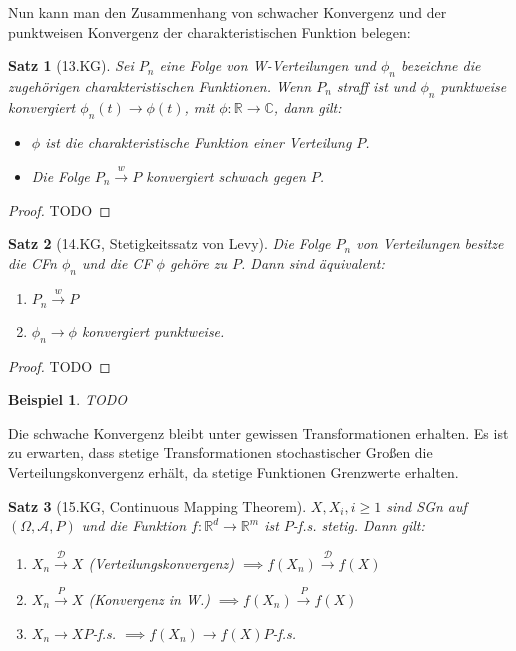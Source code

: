 \documentclass[]{article}
\newtheorem{theorem}{Satz}
\newtheorem*{example}{Beispiel}
\begin{document}
Nun kann man den Zusammenhang von schwacher Konvergenz und der punktweisen Konvergenz der charakteristischen Funktion belegen:

\begin{theorem}[13.KG]
	Sei $P_n$ eine Folge von W-Verteilungen und $\phi_n$ bezeichne die zugehörigen charakteristischen Funktionen. Wenn $P_n$ straff ist und $\phi_n$ punktweise konvergiert $\phi_n(t)\rightarrow \phi(t)$, mit $\phi:\mathbb{R}\rightarrow\mathbb{C}$, dann gilt:
	\begin{itemize}
		\item $\phi$ ist die charakteristische Funktion einer Verteilung $P$.
		\item Die Folge $P_n \xrightarrow{w}P$ konvergiert schwach gegen $P$.
	\end{itemize}
\end{theorem}

\begin{proof}
	TODO
\end{proof}

\begin{theorem}[14.KG, Stetigkeitssatz von Levy]
	Die Folge $P_n$ von Verteilungen besitze die CFn $\phi_n$ und die CF $\phi$ gehöre zu $P$. Dann sind äquivalent:
	\begin{enumerate}
		\item $P_n\xrightarrow{w} P$
		\item $\phi_n \rightarrow \phi$ konvergiert punktweise.
	\end{enumerate}
\end{theorem}

\begin{proof}
	TODO
\end{proof}

\begin{example}
	TODO
\end{example}

Die schwache Konvergenz bleibt unter gewissen Transformationen erhalten. Es ist zu erwarten, dass stetige Transformationen stochastischer Großen die Verteilungskonvergenz erhält, da stetige Funktionen Grenzwerte erhalten.

\begin{theorem}[15.KG, Continuous Mapping Theorem]
	$X, X_i, i\geq 1$ sind SGn auf $(\Omega, \mathcal{A}, P)$ und die Funktion $f:\mathbb{R}^d \rightarrow \mathbb{R}^m$ ist $P$-f.s. stetig. Dann gilt:
	\begin{enumerate}
		\item $X_n \xrightarrow{\mathcal{D}} X$ (Verteilungskonvergenz) $\implies f(X_n)\xrightarrow{\mathcal{D}} f(X)$
		\item $X_n \xrightarrow{P} X$ (Konvergenz in W.) $\implies f(X_n)\xrightarrow{P} f(X)$
		\item $X_n \rightarrow X P$-f.s. $\implies f(X_n) \rightarrow f(X) P$-f.s.
	\end{enumerate}
\end{theorem}
\end{document}
